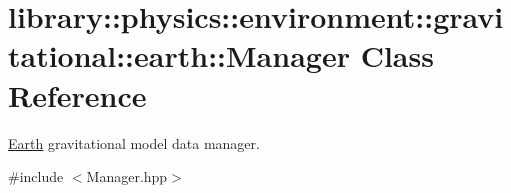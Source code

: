 \hypertarget{classlibrary_1_1physics_1_1environment_1_1gravitational_1_1earth_1_1_manager}{}\section{library\+:\+:physics\+:\+:environment\+:\+:gravitational\+:\+:earth\+:\+:Manager Class Reference}
\label{classlibrary_1_1physics_1_1environment_1_1gravitational_1_1earth_1_1_manager}


\hyperlink{classlibrary_1_1physics_1_1environment_1_1gravitational_1_1_earth}{Earth} gravitational model data manager.  




{\ttfamily \#include $<$Manager.\+hpp$>$}

